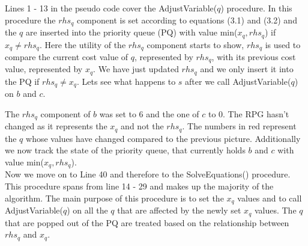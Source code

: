 Lines 1 - 13 in the pseudo code cover the AdjustVariable($q$) procedure. In this procedure the $rhs_q$ component is set according to equations (3.1) and (3.2) and the $q$ are inserted into the priority queue (PQ)  with value min($x_q, rhs_q$) if $x_q \neq rhs_q$. Here the utility of the $rhs_q$ component starts to show, $rhs_q$ is used to compare the current cost value of $q$, represented by $rhs_q$, with its previous cost value, represented by $x_q$. We have just updated $rhs_q$ and we only insert it into the PQ if $rhs_q \neq x_q$. Lets see what happens to $s$ after we call AdjustVariable($q$) on $b$ and $c$.
\newpage
\begin{center}
\end{center}

The $rhs_q$ component of $b$ was set to 6 and the one of $c$ to 0. The RPG hasn't changed as it represents the $x_q$ and not the $rhs_q$. The numbers in red represent the $q$ whose values have changed compared to the previous picture. Additionally we now track the state of the priority queue, that currently holds $b$ and $c$ with value min($x_q, rhs_q$).  \\

Now we move on to Line 40 and therefore to the SolveEquations() procedure. This procedure spans from line 14 - 29 and makes up the majority of the algorithm. The main purpose of this procedure is to set the $x_q$ values and to call AdjustVariable($q$) on all the $q$ that are affected by the newly set $x_q$ values. The $q$ that are popped out of the PQ are treated based on the relationship between $rhs_q$ and $x_q$. \\

